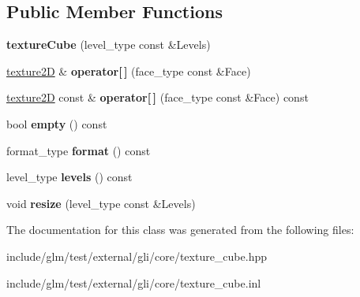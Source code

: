 \subsection*{\-Public \-Member \-Functions}
\begin{DoxyCompactItemize}
\item 
\hypertarget{classgli_1_1textureCube_a7835b9d454299a640dbda678584ca638}{{\bfseries texture\-Cube} (level\-\_\-type const \&\-Levels)}\label{classgli_1_1textureCube_a7835b9d454299a640dbda678584ca638}

\item 
\hypertarget{classgli_1_1textureCube_a5caf8c49e1f4db59aff62c084c821eec}{\hyperlink{classgli_1_1texture2D}{texture2\-D} \& {\bfseries operator\mbox{[}$\,$\mbox{]}} (face\-\_\-type const \&\-Face)}\label{classgli_1_1textureCube_a5caf8c49e1f4db59aff62c084c821eec}

\item 
\hypertarget{classgli_1_1textureCube_a2e9e25452678570cd0a8f627f555d1ed}{\hyperlink{classgli_1_1texture2D}{texture2\-D} const \& {\bfseries operator\mbox{[}$\,$\mbox{]}} (face\-\_\-type const \&\-Face) const }\label{classgli_1_1textureCube_a2e9e25452678570cd0a8f627f555d1ed}

\item 
\hypertarget{classgli_1_1textureCube_aaa5c285ac66b29647ba9c0292f41b79d}{bool {\bfseries empty} () const }\label{classgli_1_1textureCube_aaa5c285ac66b29647ba9c0292f41b79d}

\item 
\hypertarget{classgli_1_1textureCube_acb9e8b4f8986188b9b0d23de76648af1}{format\-\_\-type {\bfseries format} () const }\label{classgli_1_1textureCube_acb9e8b4f8986188b9b0d23de76648af1}

\item 
\hypertarget{classgli_1_1textureCube_a867dd3b1dd73f390dbd78e7e3144c24d}{level\-\_\-type {\bfseries levels} () const }\label{classgli_1_1textureCube_a867dd3b1dd73f390dbd78e7e3144c24d}

\item 
\hypertarget{classgli_1_1textureCube_a9033f38a5d21f2e4e68ed3a2b1ba5304}{void {\bfseries resize} (level\-\_\-type const \&\-Levels)}\label{classgli_1_1textureCube_a9033f38a5d21f2e4e68ed3a2b1ba5304}

\end{DoxyCompactItemize}


\-The documentation for this class was generated from the following files\-:\begin{DoxyCompactItemize}
\item 
include/glm/test/external/gli/core/texture\-\_\-cube.\-hpp\item 
include/glm/test/external/gli/core/texture\-\_\-cube.\-inl\end{DoxyCompactItemize}

